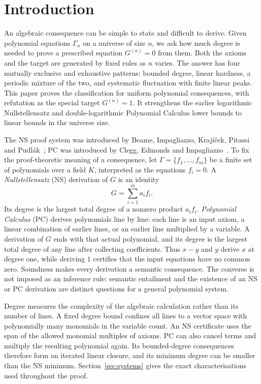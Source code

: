 \section{Introduction}\label{sec:introduction}
An algebraic consequence can be simple to state and difficult to derive.
Given polynomial equations $\Gamma_n$ on a universe of size $n$, we ask
how much degree is needed to prove a prescribed equation $G^{(n)}=0$ from
them. Both the axioms and the target are generated by fixed rules as
$n$ varies. The answer has four mutually exclusive and exhaustive
patterns: bounded degree, linear hardness, a periodic mixture of the
two, and systematic fluctuation with finite linear peaks. This paper
proves the classification for uniform polynomial consequences, with
refutation as the special target $G^{(n)}=1$. It strengthens the earlier
logarithmic Nullstellensatz and double-logarithmic Polynomial Calculus
lower bounds to linear bounds in the universe size.

The NS proof system was introduced by Beame, Impagliazzo,
Kraj\'i\v cek, Pitassi and Pudl\'ak~\cite{NSFoundations}; PC was
introduced by Clegg, Edmonds and Impagliazzo~\cite{PCFoundations}.
To fix the proof-theoretic meaning of a consequence, let
$\Gamma=\{f_1,\ldots,f_m\}$ be a finite set of polynomials over a field
$K$, interpreted as the equations $f_i=0$. A \emph{Nullstellensatz}
(NS) derivation of $G$ is an identity
\[
                         G=\sum_{i=1}^m a_i f_i.
\]
Its degree is the largest total degree of a nonzero product $a_i f_i$.
\emph{Polynomial Calculus} (PC) derives polynomials line by line: each
line is an input axiom, a linear combination of earlier lines, or an
earlier line multiplied by a variable. A derivation of $G$ ends with
that actual polynomial, and its degree is the largest total degree
of any line after collecting coefficients. Thus $x-y$ and $y$ derive
$x$ at degree one, while deriving $1$ certifies that the input equations
have no common zero. Soundness makes every derivation a semantic
consequence. The converse is not imposed as an inference rule:
semantic entailment and the existence of an NS or PC derivation are
distinct questions for a general polynomial system.

Degree measures the complexity of the algebraic calculation rather
than its number of lines. A fixed degree bound confines all lines to
a vector space with polynomially many monomials in the variable count.
An NS certificate uses the span of the allowed monomial multiples of
axioms. PC can also cancel terms and multiply the resulting polynomial
again. Its bounded-degree consequences therefore form an iterated
linear closure, and its minimum degree can be smaller than the NS
minimum. Section~\ref{sec:systems} gives the exact characterisations
used throughout the proof.

